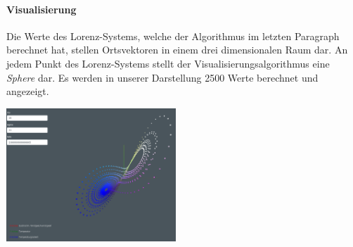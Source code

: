 \documentclass[implementation]{subfiles}
\begin{document}
	\paragraph{Visualisierung}
	Die Werte des Lorenz-Systems, welche der Algorithmus im letzten Paragraph berechnet hat, stellen Ortsvektoren in einem drei dimensionalen Raum dar. An jedem Punkt des Lorenz-Systems stellt der Visualisierungsalgorithmus eine \textit{Sphere} dar. Es werden in unserer Darstellung 2500 Werte berechnet und angezeigt.
	
	\begin{centerFigure}
		\includegraphics[height=5cm]{assets/implementation/Visualisierung}
	\end{centerFigure}
\end{document}
